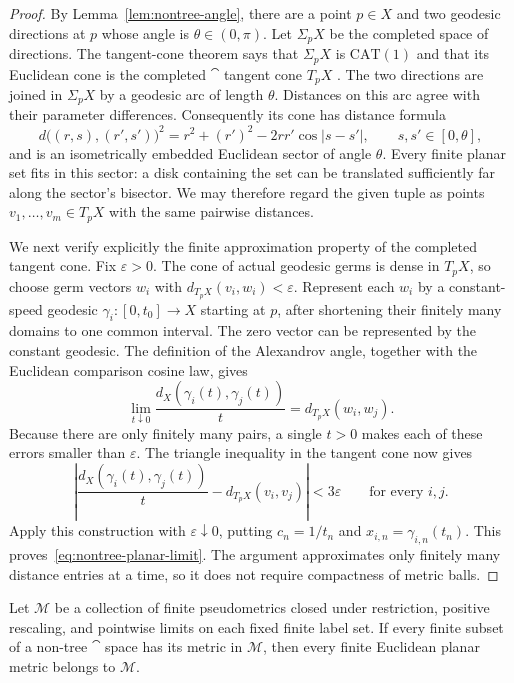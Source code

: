 \begin{proof}
By Lemma~\ref{lem:nontree-angle}, there are a point $p\in X$ and two
geodesic directions at $p$ whose angle is $\theta\in(0,\pi)$.
Let $\Sigma_pX$ be the completed space of directions.
The tangent-cone theorem says that $\Sigma_pX$ is $\mathrm{CAT}(1)$
and that its Euclidean cone is the completed $\cat$ tangent cone
$T_pX$ \cite[II.3.19, p.~191]{BH1999}.
The two directions are joined in $\Sigma_pX$ by a geodesic arc of
length $\theta$.  Distances on this arc agree with their parameter
differences.  Consequently its cone has distance formula
\[
 d\bigl((r,s),(r',s')\bigr)^2
 =r^2+(r')^2-2rr'\cos|s-s'|,
 \qquad s,s'\in[0,\theta],
\]
and is an isometrically embedded Euclidean sector of angle $\theta$.
Every finite planar set fits in this sector: a disk containing the
set can be translated sufficiently far along the sector's bisector.
We may therefore regard the given tuple as points
$v_1,\ldots,v_m\in T_pX$ with the same pairwise distances.

We next verify explicitly the finite approximation property of the
completed tangent cone.  Fix $\varepsilon>0$.  The cone of actual
geodesic germs is dense in $T_pX$, so choose germ vectors $w_i$ with
$d_{T_pX}(v_i,w_i)<\varepsilon$.
Represent each $w_i$ by a constant-speed geodesic
$\gamma_i:[0,t_0]\longrightarrow X$ starting at $p$, after shortening
their finitely many domains to one common interval.
The zero vector can be represented by the constant geodesic.
The definition of the Alexandrov angle, together with the Euclidean
comparison cosine law, gives
\[
 \lim_{t\downarrow0}\frac{d_X(\gamma_i(t),\gamma_j(t))}{t}
   =d_{T_pX}(w_i,w_j).
\]
Because there are only finitely many pairs, a single $t>0$ makes
each of these errors smaller than $\varepsilon$.
The triangle inequality in the tangent cone now gives
\[
 \left|\frac{d_X(\gamma_i(t),\gamma_j(t))}{t}
       -d_{T_pX}(v_i,v_j)\right|<3\varepsilon
 \qquad\text{for every }i,j.
\]
Apply this construction with $\varepsilon\downarrow0$, putting
$c_n=1/t_n$ and $x_{i,n}=\gamma_{i,n}(t_n)$.
This proves~\eqref{eq:nontree-planar-limit}.
The argument approximates only finitely many distance entries at a
time, so it does not require compactness of metric balls.
\end{proof}

\begin{corollary}\label{cor:closed-metric-planar-family}
Let $\mathcal M$ be a collection of finite pseudometrics closed under
restriction, positive rescaling, and pointwise limits on each fixed
finite label set.  If every finite subset of a non-tree $\cat$ space
has its metric in $\mathcal M$, then every finite Euclidean planar
metric belongs to $\mathcal M$.
\end{corollary}

